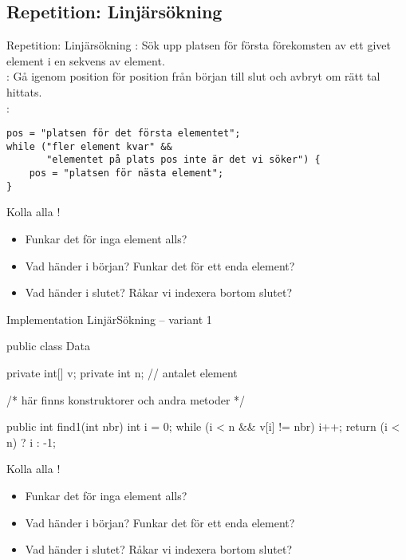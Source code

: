 \documentclass{lecturenotes}
\begin{document}
\subsection{Repetition: Linjärsökning}
\begin{Slide}{Repetition: Linjärsökning }\footnotesize
{}: Sök upp platsen för första förekomsten av ett givet element i en sekvens av element. \\ 
: Gå igenom position för position från början till slut och avbryt om rätt tal hittats. \\
\vspace{1em}
:
\begin{lstlisting}
pos = "platsen för det första elementet";
while ("fler element kvar" &&
       "elementet på plats pos inte är det vi söker") {
    pos = "platsen för nästa element";
}
\end{lstlisting}
Kolla alla !
\begin{itemize}
\item Funkar det för inga element alls?
\item Vad händer i början? Funkar det för ett enda element?
\item Vad händer i slutet? Råkar vi indexera bortom slutet?
\end{itemize}
\end{Slide}


\begin{Slide}{Implementation LinjärSökning -- variant 1}
\begin{Code}
public class Data {
    private int[] v;
    private int n;  // antalet element

    /* här finns konstruktorer och andra metoder */
    
    public int find1(int nbr) {
        int i = 0;
        while (i < n && v[i] != nbr) {
            i++;
        }
        return (i < n) ? i : -1;
    }
}
\end{Code}
\footnotesize Kolla alla !
\begin{itemize}
\item Funkar det för inga element alls?
\item Vad händer i början? Funkar det för ett enda element?
\item Vad händer i slutet? Råkar vi indexera bortom slutet?
\end{itemize}
\end{Slide} 
\end{document}

